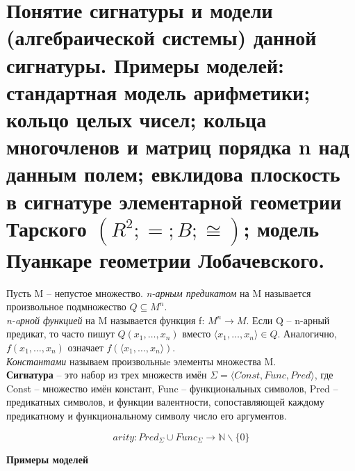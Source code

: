 \section{Понятие сигнатуры и модели (алгебраической системы) данной сигнатуры. Примеры моделей: стандартная модель арифметики; кольцо целых чисел; кольца многочленов и матриц порядка n над данным полем; евклидова плоскость в сигнатуре элементарной геометрии Тарского $(R^{2}; =; B; \cong)$; модель Пуанкаре геометрии Лобачевского.}

\begin{definition}
    Пусть M -- непустое множество. \textit{n-арным предикатом} на M называется произвольное подмножество $Q \subseteq M^{n}$. \\
    \textit{n-aрной функцией} на M называется функция f: $M^{n}\to M$.
    Если Q -- n-арный предикат, то часто пишут $Q(x_1, \ldots , x_n)$ вместо $\langle x_1, \ldots , x_n \rangle \in Q$. Аналогично, $f(x_1, \ldots , x_n)$ означает $f (\langle x_1, \ldots , x_n \rangle)$.\\
    \textit{Константами} называем произвольныe элементы множества M.\\
    \textbf{Сигнатура} -- это набор из трех множеств имён $\varSigma =  \langle Const, Func, Pred \rangle $, где Const -- множество имён констант, Func -- функциональных символов, Pred -- предикатных символов, и функции валентности, сопоставляющей каждому предикатному и функциональному символу число его аргументов.$\label{formula2}$

    $$arity : Pred_\Sigma \cup Func_\Sigma \rightarrow \mathbb{N} \backslash\{0\}$$
\end{definition}


\begin{center}
\textbf{Примеры моделей}
\end{center}

